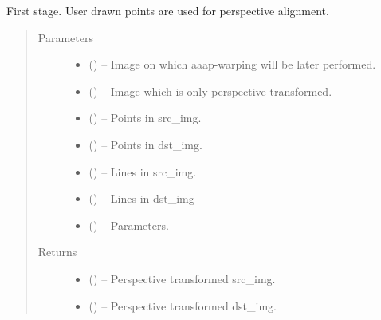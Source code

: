 \documentclass[letterpaper,10pt,english]{sphinxmanual}
\begin{document}
\begin{fulllineitems}
\label{\detokenize{aaap_re_photo:aaap_re_photo.stage_one}}
First stage. User drawn points are used for perspective alignment.
\begin{quote}\begin{description}
\item[{Parameters}] \leavevmode\begin{itemize}
\item {} 
 () -- Image on which aaap-warping will be later performed.

\item {} 
 () -- Image which is only perspective transformed.

\item {} 
 () -- Points in src\_img.

\item {} 
 () -- Points in dst\_img.

\item {} 
 () -- Lines in src\_img.

\item {} 
 () -- Lines in dst\_img

\item {} 
 () -- Parameters.

\end{itemize}

\item[{Returns}] \leavevmode
\begin{itemize}
\item {} 
 () -- Perspective transformed src\_img.

\item {} 
 () -- Perspective transformed dst\_img.


\end{itemize}
\end{description}
\end{quote}
\end{fulllineitems}
\end{document}
